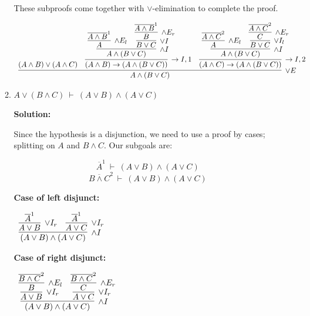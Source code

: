 \documentclass[11pt]{report}
\newcommand{\temp}[2]{{\overline{#2}}^{#1}}
\begin{document}
\begin{enumerate}
\begin{enumerate}
		These subproofs come together with $\lor$-elimination to complete the proof. 

		\begin{scriptsize}
			\begin{center}
				$\begin{array}{c}
					\infer[\lor E]{A \land (B \lor C)}
						{(A \land B) \lor (A \land C)
						&
						\infer[\to I, 1]{(A \land B) \to (A \land (B \lor C))}
							{\infer[\land I]{A \land (B \lor C)}
								{\infer[\land E_{l}]{A}{\temp{1}{A \land B}}
								&
							\infer[\lor I]{B \lor C}
								{\infer[\land E_{r}]{B}
									{\temp{1}{A \land B}}}}}
						&
						\infer[\to I, 2]{(A \land C) \to (A \land (B \lor C))}
							{\infer[\land I]{A \land (B \lor C)}
								{\infer[\land E_{l}]{A}{\temp{2}{A \land C}}
								&
							\infer[\lor I_{l}]{B \lor C}
								{\infer[\land E_{r}]{C}
									{\temp{2}{A \land C}}}}}}				
				\end{array}$
			\end{center}
		\end{scriptsize}

		\newpage
		\item $A \lor (B \land C) \ \vdash \ (A \lor B) \land (A \lor C)$
		
		\textbf{Solution:}

		Since the hypothesis is a disjunction, we need to use a proof by cases; splitting on $A$ and $B \land C$. Our subgoals are: 

		$$\temp{1}{A} \ \vdash \ (A \lor B) \land (A \lor C) $$
		$$\temp{2}{B \land C} \ \vdash \ (A \lor B) \land (A \lor C) $$

		\textbf{Case of left disjunct:}

		\begin{center}
			$\begin{array}{c}
				\infer[\land I]{(A \lor B) \land (A \lor C)}
					{\infer[\lor I_{r}]{A \lor B}{\temp{1}{A}}
					&
					\infer[\lor I_{r}]{A \lor C}{\temp{1}{A}}}
			\end{array}$
		\end{center}


		\textbf{Case of right disjunct:}

		\begin{center}
			$\begin{array}{c}
				\infer[\land I]{(A \lor B) \land (A \lor C)}
					{\infer[\lor I_{r}]{A \lor B}
						{\infer[\land E_{l}]{B}{\temp{2}{B \land C}}}
					&
					\infer[\lor I_{r}]{A \lor C}
						{\infer[\land E_{r}]{C}{\temp{2}{B \land C}}}}
			\end{array}$
		\end{center}		


\end{enumerate}
\end{enumerate}
\end{document}
